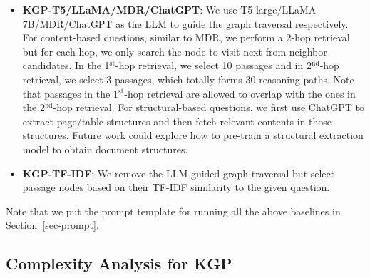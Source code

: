 \begin{itemize}[leftmargin=*]
    \item \textbf{KGP-T5/LLaMA/MDR/ChatGPT}: We use T5-large/LLaMA-7B/MDR/ChatGPT as the LLM to guide the graph traversal respectively. For content-based questions, similar to MDR, we perform a 2-hop retrieval but for each hop, we only search the node to visit next from neighbor candidates. In the 1$^{\text{st}}$-hop retrieval, we select 10 passages and in 2$^{\text{nd}}$-hop retrieval, we select 3 passages, which totally forms 30 reasoning paths. Note that passages in the 1$^{\text{st}}$-hop retrieval are allowed to overlap with the ones in the 2$^{\text{nd}}$-hop retrieval. For structural-based questions, we first use ChatGPT to extract page/table structures and then fetch relevant contents in those structures. Future work could explore how to pre-train a structural extraction model to obtain document structures.

    \item \textbf{KGP-TF-IDF}: We remove the LLM-guided graph traversal but select passage nodes based on their TF-IDF similarity to the given question.

\end{itemize}

Note that we put the prompt template for running all the above baselines in Section~\ref{sec-prompt}.
 

\subsection{Complexity Analysis for KGP}\label{sup-KGP}

